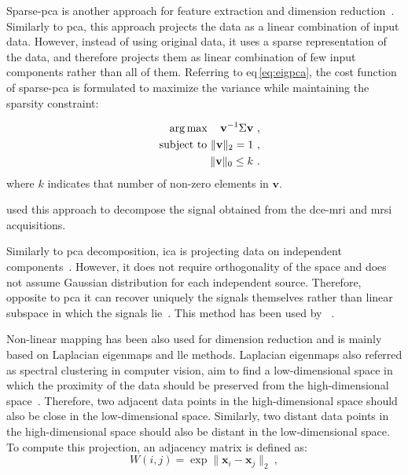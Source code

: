 Sparse-\ac{pca} is another approach for feature extraction and dimension
reduction~\cite{zou2006sparse}.
Similarly to \ac{pca}, this approach projects the data as a linear combination
of input data.
However, instead of using original data, it uses a sparse representation of the
data, and therefore projects them as linear combination of few input components
rather than all of them.
Referring to \acs{eq}\,\eqref{eq:eigpca}, the cost function of sparse-\ac{pca}
is formulated to maximize the variance while maintaining the sparsity
constraint:

\begin{eqnarray}
 && \operatorname*{arg\,max} \quad   \mathbf{v}^{-1} \Sigma \mathbf{v}\ , \label{eq:sparsepca}\\
 && \text{subject to }  \Vert \mathbf{v} \Vert_{2} = 1\ , \nonumber \\
 && \Vert \mathbf{v} \Vert_{0} \leq k\ . \nonumber
\end{eqnarray}
\noindent where $k$ indicates that number of non-zero elements in $\mathbf{v}$.

\citeauthor{Lemaitre2016thesis} used this approach to decompose the signal
obtained from the \ac{dce}-\ac{mri} and \ac{mrsi} acquisitions.

Similarly to \ac{pca} decomposition, \ac{ica} is projecting data on independent
components~\cite{comon1994independent}.
However, it does not require orthogonality of the space and does not assume
Gaussian distribution for each independent source.
Therefore, opposite to \ac{pca} it can recover uniquely the signals themselves
rather than linear subspace in which the signals lie~\cite{murphy2012machine}.
This method has been used by
\citeauthor{Lemaitre2016thesis}~\cite{Lemaitre2016thesis}.

Non-linear mapping has been also used for dimension reduction and is mainly
based on Laplacian eigenmaps and \acf{lle} methods.
Laplacian eigenmaps also referred as spectral clustering in computer vision,
aim to find a low-dimensional space in which the proximity of the data should
be preserved from the high-dimensional space~\cite{Shi2000,Belkin2001}.
Therefore, two adjacent data points in the high-dimensional space should also
be close in the low-dimensional space.
Similarly, two distant data points in the high-dimensional space should also be
distant in the low-dimensional space.
To compute this projection, an adjacency matrix is defined as:
\begin{equation}
  W(i,j) = \exp \| \mathbf{x}_i - \mathbf{x}_j \|_2 \ ,
  \label{eq:gew}
\end{equation}

